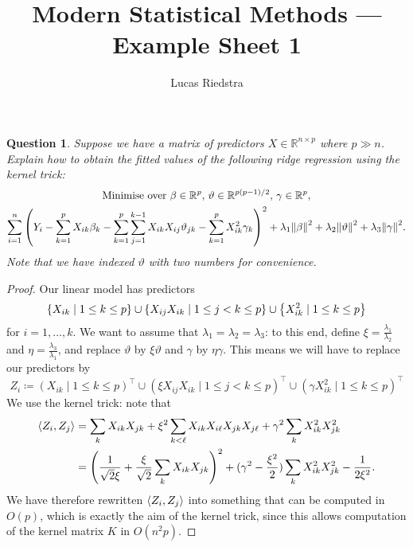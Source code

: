 \documentclass{article}
\title{Modern Statistical Methods --- Example Sheet 1} %
\author{Lucas Riedstra}
\theoremstyle{plain}
\newtheorem{question}{Question}
\theoremstyle{remark}
\renewcommand{\theta}{\vartheta}
\newcommand{\Bb}{\mathbb}
\newcommand{\RR}{\Bb R}
\DeclarePairedDelimiter{\ang}{\langle}{\rangle}
\newcommand{\T}{^\top} %
\newcommand\ceq\coloneqq %
\begin{document}
\maketitle

\setcounter{question}{6}

\begin{question}
	Suppose we have a matrix of predictors $X \in \RR^{n \times p}$ where $p \gg n$. Explain how to obtain the fitted values of the following ridge regression using the kernel trick:
	\begin{gather*}
		\text{Minimise over $\beta \in \RR^p$, $\theta \in \RR^{p(p-1)/2}$, $\gamma \in \RR^p$,} \\
		\sum_{i=1}^n \qty(Y_i - \sum_{k=1}^p X_{ik}\beta_k - \sum_{k=1}^p \sum_{j=1}^{k-1} X_{ik} X_{ij} \theta_{jk} - \sum_{k=1}^p X_{ik}^2\gamma_k)^2 + \lambda_1 \norm{\beta}^2 + \lambda_2 \norm{\theta}^2 + \lambda_3\norm{\gamma}^2. 
	\end{gather*}
Note that we have indexed $\theta$ with two numbers for convenience. 
\end{question}

\begin{proof}
	Our linear model has predictors
	\[
	\qty{X_{ik} \mid 1 \leq k \leq p} \cup \qty{X_{ij} X_{ik} \mid 1 \leq j < k \leq p} \cup \qty{X_{ik}^2 \mid 1 \leq k \leq p}
	\]
	for $i = 1, \dotsc, k$. We want to assume that $\lambda_1 = \lambda_2 = \lambda_3$: to this end, define $\xi = \frac{\lambda_1}{\lambda_2}$ and $\eta = \frac{\lambda_3}{\lambda_1}$, and replace $\theta$ by $\xi\theta$ and $\gamma$ by $\eta\gamma$. This means we will have to replace our predictors by
	\[
	Z_i \ceq 
	(X_{ik} \mid 1 \leq k \leq p)\T \cup (\xi X_{ij} X_{ik} \mid 1 \leq j < k \leq p)\T \cup (\gamma X_{ik}^2 \mid 1 \leq k \leq p)\T
	\]
	We use the kernel trick: note that
	\begin{align*}
	\ang{Z_i, Z_j} &= \sum_k X_{ik}X_{jk} + \xi^2 \sum_{k < \ell} X_{ik} X_{i\ell} X_{jk} X_{j\ell} + \gamma^2 \sum_k X_{ik}^2 X_{jk}^2 \\
	&= \qty(\frac{1}{\sqrt 2\xi} + \frac{\xi}{\sqrt 2}\sum_k X_{ik}X_{jk})^2 + (\gamma^2 - \frac{\xi^2}{2})\sum_k X_{ik}^2 X_{jk}^2 - \frac{1}{2\xi^2}.
	\end{align*}
	We have therefore rewritten $\ang{Z_i, Z_j}$ into something that can be computed in $O(p)$, which is exactly the aim of the kernel trick, since this allows computation of the kernel matrix $K$ in $O(n^2 p)$. 
\end{proof}
\end{document}
